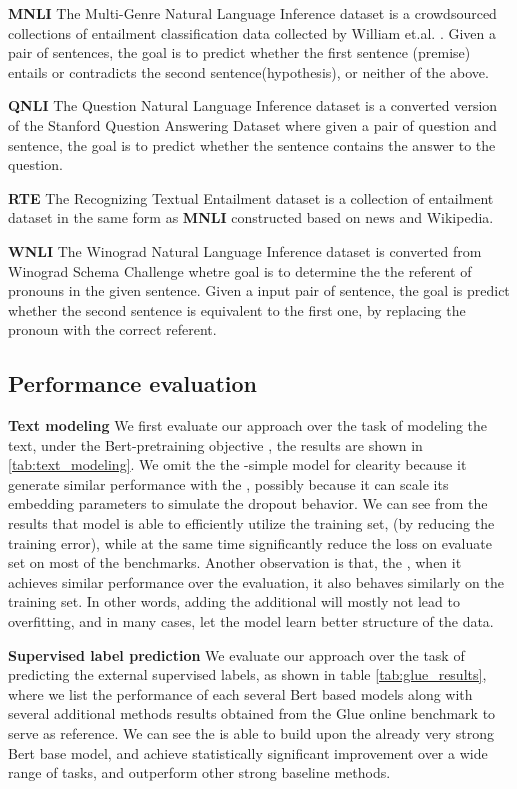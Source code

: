\noindent \textbf{MNLI} The Multi-Genre Natural Language Inference dataset is a crowdsourced collections of entailment classification data collected by William et.al. \cite{williams2017broad}. 
Given a pair of sentences, the goal is to predict whether the first sentence (premise) entails or contradicts the second sentence(hypothesis), or neither of the above.

\noindent \textbf{QNLI} The Question Natural Language Inference dataset is a converted version of the Stanford Question Answering Dataset where given a pair of question and sentence, the goal is to predict whether the sentence contains the answer to the question.

\noindent \textbf{RTE} The Recognizing Textual Entailment dataset is a collection of entailment dataset in the same form as \textbf{MNLI} constructed based on news and Wikipedia.

\noindent \textbf{WNLI} The Winograd Natural Language Inference dataset is converted from Winograd Schema Challenge whetre goal is to determine the the referent of pronouns in the given sentence. Given a input pair of sentence, the goal is predict whether the second sentence is equivalent to the first one, by replacing the pronoun with the correct referent.




\subsection{Performance evaluation}
\noindent \textbf{Text modeling}
We first evaluate our approach over the task of modeling the text, under the Bert-pretraining objective \cite{devlin2018bert}, the results are shown in \autoref{tab:text_modeling}. We omit the the \BertMWE-simple model for clearity because it generate similar performance with the \BertMWE, possibly because it can scale its embedding parameters to simulate the dropout behavior.
We can see from the results that \BertMWE model is able to efficiently utilize the training set, (by reducing the training error), while at the same time significantly reduce the loss on evaluate set on most of the benchmarks. Another observation is that, the \BertMWE, when it achieves similar performance over the evaluation, it also behaves similarly on the training set. In other words, adding the additional will mostly not lead to overfitting, and in many cases, let the model learn better structure of the data.

\noindent \textbf{Supervised label prediction}
We evaluate our approach over the task of predicting the external supervised labels, as shown in table \autoref{tab:glue_results},
where we list the performance of each several Bert based models along with several additional methods results obtained from the Glue online benchmark to serve as reference.
We can see the \BertMWE is able to build upon the already very strong Bert base model, and achieve statistically significant improvement over a wide range of tasks, and outperform other strong baseline methods.





